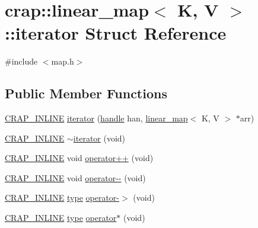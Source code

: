 \hypertarget{structcrap_1_1linear__map_1_1iterator}{\section{crap\+:\+:linear\+\_\+map$<$ K, V $>$\+:\+:iterator Struct Reference}
\label{structcrap_1_1linear__map_1_1iterator}
}


{\ttfamily \#include $<$map.\+h$>$}

\subsection*{Public Member Functions}
\begin{DoxyCompactItemize}
\item 
\hyperlink{config__x86_8h_a5a40526b8d842e7ff731509998bb0f1c}{C\+R\+A\+P\+\_\+\+I\+N\+L\+I\+N\+E} \hyperlink{structcrap_1_1linear__map_1_1iterator_a7f31cb51a5f4fe5da990d82a93f9cd9a}{iterator} (\hyperlink{classcrap_1_1linear__map_af77a9e092bd3ffb9557327bd3082e47f}{handle} han, \hyperlink{classcrap_1_1linear__map}{linear\+\_\+map}$<$ K, V $>$ $\ast$arr)
\item 
\hyperlink{config__x86_8h_a5a40526b8d842e7ff731509998bb0f1c}{C\+R\+A\+P\+\_\+\+I\+N\+L\+I\+N\+E} \hyperlink{structcrap_1_1linear__map_1_1iterator_a633e552e0951df8002076e00b01c96d4}{$\sim$iterator} (void)
\item 
\hyperlink{config__x86_8h_a5a40526b8d842e7ff731509998bb0f1c}{C\+R\+A\+P\+\_\+\+I\+N\+L\+I\+N\+E} void \hyperlink{structcrap_1_1linear__map_1_1iterator_ae812bfec10189c7b9e5de6694c5f3100}{operator++} (void)
\item 
\hyperlink{config__x86_8h_a5a40526b8d842e7ff731509998bb0f1c}{C\+R\+A\+P\+\_\+\+I\+N\+L\+I\+N\+E} void \hyperlink{structcrap_1_1linear__map_1_1iterator_a96a8152ada3b980e3c69a0ec84d7d6f7}{operator-\/-\/} (void)
\item 
\hyperlink{config__x86_8h_a5a40526b8d842e7ff731509998bb0f1c}{C\+R\+A\+P\+\_\+\+I\+N\+L\+I\+N\+E} \hyperlink{classcrap_1_1linear__map_ad8544be54068ac03936e6696c076bf9a}{type} \hyperlink{structcrap_1_1linear__map_1_1iterator_af4306e30260370f4b7a55a39f758331d}{operator-\/$>$} (void)
\item 
\hyperlink{config__x86_8h_a5a40526b8d842e7ff731509998bb0f1c}{C\+R\+A\+P\+\_\+\+I\+N\+L\+I\+N\+E} \hyperlink{classcrap_1_1linear__map_ad8544be54068ac03936e6696c076bf9a}{type} \hyperlink{structcrap_1_1linear__map_1_1iterator_ad235018ca326c881e29ba6c4e1be72ce}{operator$\ast$} (void)

\end{DoxyCompactItemize}
